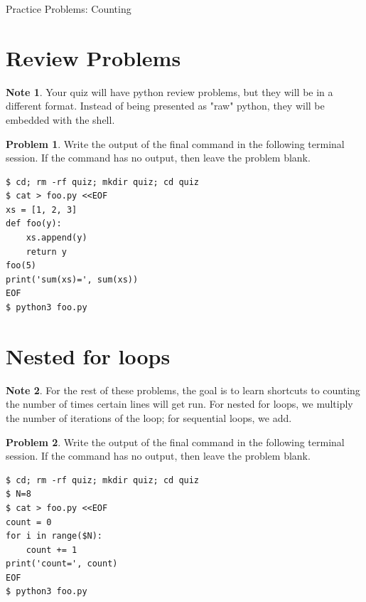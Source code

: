 \documentclass[10pt]{article}
\theoremstyle{definition}
\newtheorem{problem}{Problem}
\newtheorem{note}{Note}
\begin{document}
\begin{center}
    {
\Large
    Practice Problems: Counting
}

    \vspace{0.1in}
\end{center}

\section{Review Problems}

\begin{note}
    Your quiz will have python review problems, but they will be in a different format.
    Instead of being presented as "raw" python,
    they will be embedded with the shell.
\end{note}

\filbreak
\begin{problem}
    Write the output of the final command in the following terminal session.
    If the command has no output, then leave the problem blank.
\end{problem}
\begin{lstlisting}
$ cd; rm -rf quiz; mkdir quiz; cd quiz
$ cat > foo.py <<EOF
xs = [1, 2, 3]
def foo(y):
    xs.append(y)
    return y
foo(5)
print('sum(xs)=', sum(xs))
EOF
$ python3 foo.py
\end{lstlisting}

\section{Nested for loops}

\begin{note}
    For the rest of these problems, the goal is to learn shortcuts to counting the number of times certain lines will get run.
    For nested for loops, we multiply the number of iterations of the loop;
    for sequential loops, we add.
\end{note}

\filbreak
\begin{problem}
    Write the output of the final command in the following terminal session.
    If the command has no output, then leave the problem blank.
\end{problem}
\begin{lstlisting}
$ cd; rm -rf quiz; mkdir quiz; cd quiz
$ N=8
$ cat > foo.py <<EOF
count = 0
for i in range($N):
    count += 1
print('count=', count)
EOF
$ python3 foo.py
\end{lstlisting}
\vspace{0.4in}
\end{document}
